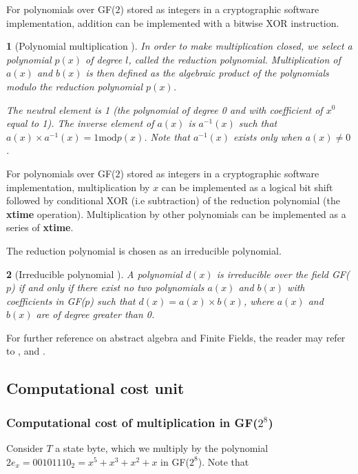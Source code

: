\documentclass{report}
\newtheorem*{concept}{}{\bfseries}{\itshape}
\begin{document}
For polynomials over GF($2$) stored as integers in a cryptographic software implementation, addition can be implemented with a bitwise XOR instruction.

\begin{concept}[Polynomial multiplication \cite{DesignOfRijndael2002}]
In order to make multiplication closed, we select a polynomial $p(x)$ of degree $l$, called the \emph{reduction polynomial}. Multiplication of $a(x)$ and $b(x)$ is then defined as the algebraic product of the polynomials modulo the reduction polynomial $p(x)$.

The neutral element is 1 (the polynomial of degree 0 and with coefficient of $x^0$ equal to 1). The inverse element of $a(x)$ is $a^{-1}(x)$ such that $a(x) \times a^{-1}(x) = 1 \text{mod} p(x)$. Note that $a^{-1}(x)$ exists only when $a(x) \neq 0$.
\end{concept}

For polynomials over GF($2$) stored as integers in a cryptographic software implementation, multiplication by $x$ can be implemented as a logical bit shift followed by conditional XOR (i.e subtraction) of the reduction polynomial (the \textbf{xtime} operation). Multiplication by other polynomials can be implemented as a series of \textbf{xtime}.

The reduction polynomial is chosen as an irreducible polynomial.

\begin{concept}[Irreducible polynomial \cite{DesignOfRijndael2002}]
A polynomial $d(x)$ is irreducible over the field GF($p$) if and only if there exist no two polynomials $a(x)$ and $b(x)$ with coefficients in GF($p$) such that $d(x) = a(x) \times b(x)$, where $a(x)$ and $b(x)$ are of degree greater than 0.
\end{concept}

For further reference on abstract algebra and Finite Fields, the reader may refer to \cite{panario2007topicos}, \cite{panario2013handbook} and \cite{Handbook1996}.

\subsection{Computational cost unit}\label{sec:comp-cost}

\subsubsection{Computational cost of multiplication in GF($2^8$)}
Consider $T$ a state byte, which we multiply by the polynomial $2e_x = 00101110_2 = x^5 + x^3 + x^2 + x$ in GF($2^8$). Note that
\end{document}
